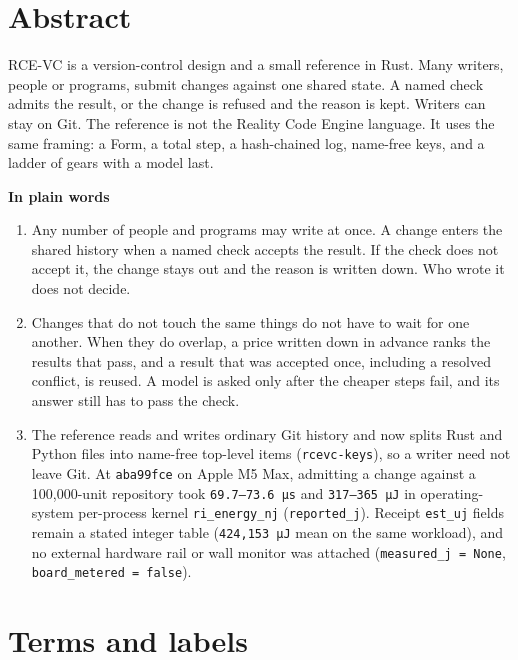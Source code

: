 \documentclass[10pt,letterpaper]{article}
\providecommand{\tightlist}{\setlength{\itemsep}{1pt}\setlength{\parskip}{0pt}}
\begin{document}
\section{Abstract}\label{abstract}

RCE-VC is a version-control design and a small reference in Rust. Many
writers, people or programs, submit changes against one shared state. A
named check admits the result, or the change is refused and the reason
is kept. Writers can stay on Git. The reference is not the Reality Code
Engine language. It uses the same framing: a Form, a total step, a
hash-chained log, name-free keys, and a ladder of gears with a model
last.

\textbf{In plain words}

\begin{enumerate}
\def\labelenumi{\arabic{enumi}.}
\tightlist
\item
  Any number of people and programs may write at once. A change enters
  the shared history when a named check accepts the result. If the check
  does not accept it, the change stays out and the reason is written
  down. Who wrote it does not decide.
\item
  Changes that do not touch the same things do not have to wait for one
  another. When they do overlap, a price written down in advance ranks
  the results that pass, and a result that was accepted once, including
  a resolved conflict, is reused. A model is asked only after the
  cheaper steps fail, and its answer still has to pass the check.
\item
  The reference reads and writes ordinary Git history and now splits
  Rust and Python files into name-free top-level items
  (\texttt{rcevc-keys}), so a writer need not leave Git. At
  \texttt{aba99fce} on Apple M5 Max, admitting a change against a
  100,000-unit repository took \texttt{69.7–73.6\ µs} and
  \texttt{317–365\ µJ} in operating-system per-process kernel
  \texttt{ri\_energy\_nj} (\texttt{reported\_j}). Receipt
  \texttt{est\_uj} fields remain a stated integer table
  (\texttt{424,153\ µJ} mean on the same workload), and no external
  hardware rail or wall monitor was attached
  (\texttt{measured\_\allowbreak{}j\ =\ None}, \texttt{board\_\allowbreak{}metered\ =\ false}).
\end{enumerate}

\section{Terms and labels}\label{terms-and-labels}
\end{document}
